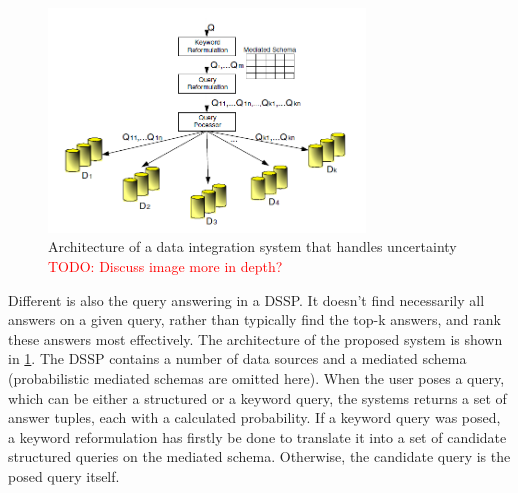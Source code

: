 \begin{figure}[H]
	\begin{center}
		\includegraphics[width=0.75\textwidth]{figures/DataModelingInDSSPs-Figure1.png}
	\end{center}
	\caption{Architecture of a data integration system that handles uncertainty \textcolor{red}{TODO: Discuss image more in depth?}}
	\label{DataModelingInDSSPsFigure1}
\end{figure}

Different is also the query answering in a DSSP. It doesn't find necessarily all answers on a given query, rather than typically find the top-k answers, and rank these answers most effectively. 
The architecture of the proposed system is shown in \ref{DataModelingInDSSPsFigure1}. The DSSP contains a number of data sources and a mediated schema (probabilistic mediated schemas are omitted here). When the user poses a query, which can be either a structured or a keyword query, the systems returns a set of answer tuples, each with a calculated probability. If a keyword query was posed, a keyword reformulation has firstly be done to translate it into a set of candidate structured queries on the mediated schema. Otherwise, the candidate query is the posed query itself.